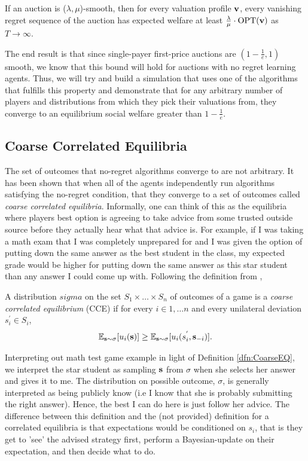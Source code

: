 \documentclass[12pt,twoside]{reedthesis}
\begin{document}
\begin{theorem}
	If an auction is ($\lambda, \mu$)-smooth, then for every valuation profile $\textbf{v}$, every vanishing regret sequence of the auction has expected welfare at least $\frac{\lambda}{\mu} \cdot \text{OPT}(\textbf{v})$ as $T \rightarrow \infty$.  
\end{theorem}

The end result is that since single-payer first-price auctions are $(1-\frac{1}{e}, 1)$ smooth, we know that this bound will hold for auctions with no regret learning agents. Thus, we will try and build a simulation that uses one of the algorithms that fulfills this property and demonstrate that for any arbitrary number of players and distributions from which they pick their valuations from, they converge to an equilibrium social welfare greater than $1-\frac{1}{e}$.

\subsection{Coarse Correlated Equilibria}
The set of outcomes that no-regret algorithms converge to are not arbitrary. It has been shown that when all of the agents independently run algorithms satisfying the no-regret condition, that they converge to a set of outcomes called {\em coarse correlated equilibria}. Informally, one can think of this as the equilibria where players best option is agreeing to take advice from some trusted outside source before they actually hear what that advice is. For example, if I was taking a math exam that I was completely unprepared for and I was given the option of putting down the same answer as the best student in the class, my expected grade would be higher for putting down the same answer as this star student than any answer I could come up with. Following the definition from \cite{Roughgarden2016},

\begin{dfn}
	A distribution $sigma$ on the set $S_1 \times \ldots \times S_n$ of outcomes of a game is a {\em coarse correlated equilibrium} (CCE) if for every $i \in {1, \ldots n}$ and every unilateral deviation $s_i^{'} \in S_i$,
	$$\mathbb{E}_{\textbf{s} \sim \sigma}[u_i(\textbf{s})] \geq \mathbb{E}_{\textbf{s} \sim \sigma}[u_i(s_i^{'}, \textbf{s}_{-i})].$$
	\label{dfn:CoarseEQ}
\end{dfn}

Interpreting out math test game example in light of Definition \ref{dfn:CoarseEQ}, we interpret the star student as sampling $\textbf{s}$ from $\sigma$ when she selects her answer and gives it to me. The distribution on possible outcome, $\sigma$, is generally interpreted as being publicly know (i.e I know that she is probably submitting the right answer). Hence, the best I can do here is just follow her advice. The difference between this definition and the (not provided) definition for a correlated equilibria is that expectations would be conditioned on $s_i$, that is they get to 'see' the advised strategy first, perform a Bayesian-update on their expectation, and then decide what to do. 
\end{document}

